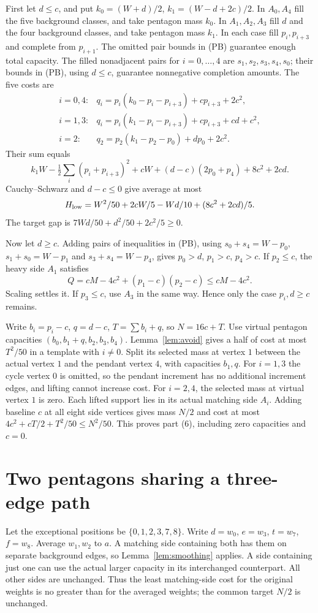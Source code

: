 \documentclass[11pt]{article}
\begin{document}
First let $d\leq c$, and put
$k_0=(W+d)/2$, $k_1=(W-d+2c)/2$.
In $A_0,A_4$ fill the five background classes, and take pentagon mass $k_0$.
In $A_1,A_2,A_3$ fill $d$ and the four background classes, and take
pentagon mass $k_1$.
In each case fill $p_i,p_{i+3}$ and complete from $p_{i+1}$.
The omitted pair bounds in (PB) guarantee enough total capacity.
The filled nonadjacent pairs for $i=0,\ldots,4$ are
$s_1,s_2,s_3,s_4,s_0$; their bounds in (PB), using $d\leq c$,
guarantee nonnegative completion amounts.
The five costs are
\[
\begin{array}{ll}
 i=0,4:&q_i=p_i(k_0-p_i-p_{i+3})+cp_{i+3}+2c^2,\\
 i=1,3:&q_i=p_i(k_1-p_i-p_{i+3})+cp_{i+3}+cd+c^2,\\
 i=2:&q_2=p_2(k_1-p_2-p_0)+dp_0+2c^2 .
\end{array}
\]
Their sum equals
\[
 k_1W-\tfrac12\sum_i(p_i+p_{i+3})^2+cW
 +(d-c)(2p_0+p_4)+8c^2+2cd .
\]
Cauchy--Schwarz and $d-c\leq0$ give average at most
\[
 H_{\rm low}=W^2/50+2cW/5-Wd/10+(8c^2+2cd)/5 .
\]
The target gap is $7Wd/50+d^2/50+2c^2/5\geq0$.

Now let $d\geq c$.
Adding pairs of inequalities in (PB), using
$s_0+s_4=W-p_0$, $s_1+s_0=W-p_1$ and $s_3+s_4=W-p_4$,
gives $p_0>d$, $p_1>c$, $p_4>c$.
If $p_2\leq c$, the heavy side $A_1$ satisfies
\[
 Q=cM-4c^2+(p_1-c)(p_2-c)\leq cM-4c^2 .
\]
Scaling settles it. If $p_3\leq c$, use $A_3$ in the same way.
Hence only the case $p_i,d\geq c$ remains.

Write $b_i=p_i-c$, $q=d-c$, $T=\sum b_i+q$, so $N=16c+T$.
Use virtual pentagon capacities
$(b_0,b_1+q,b_2,b_3,b_4)$.
Lemma~\ref{lem:avoid} gives a half of cost at most $T^2/50$ in a
template with $i\ne0$.
Split its selected mass at vertex $1$ between the actual vertex $1$
and the pendant vertex $4$, with capacities $b_1,q$.
For $i=1,3$ the cycle vertex $0$ is omitted, so the pendant increment
has no additional increment edges, and lifting cannot increase cost.
For $i=2,4$, the selected mass at virtual vertex $1$ is zero.
Each lifted support lies in its actual matching side $A_i$.
Adding baseline $c$ at all eight side vertices gives mass $N/2$ and cost
at most $4c^2+cT/2+T^2/50\leq N^2/50$.
This proves part (6), including zero capacities and $c=0$.

\section{Two pentagons sharing a three-edge path}
Let the exceptional positions be $\{0,1,2,3,7,8\}$.
Write $d=w_0$, $e=w_3$, $t=w_7$, $f=w_8$.
Average $w_1,w_2$ to $a$.
A matching side containing both has them on separate background edges,
so Lemma~\ref{lem:smoothing} applies.
A side containing just one can use the actual larger capacity in its
interchanged counterpart. All other sides are unchanged.
Thus the least matching-side cost for the original weights is no greater
than for the averaged weights; the common target $N/2$ is unchanged.
\end{document}
